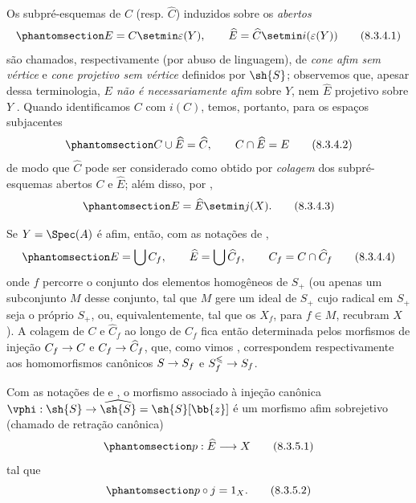 \documentclass[oneside,10pt]{amsart}
\makeatletter
\renewcommand{\leq}{\leqslant}
\newcommand{\ega@arrow}[2]{\mathchoice{#1}{#2}{#2}{#2}}
\renewcommand{\to}{\ega@arrow{\longrightarrow}{\rightarrow}}
\newcommand{\oldpage}[2][]{\marginnote{\normalfont\footnotesize\textbf{#1}~|~#2}\ignorespaces}
\let\EGAOriginalLabel\label
\renewcommand{\label}[1]{\phantomsection\EGAOriginalLabel{#1}}
\makeatother
\begin{document}
\begin{env}[8.3.4]
\label{II.8.3.4}
Os subpré-esquemas de $C$ (resp. $\widehat{C}$) induzidos sobre os \emph{abertos}
\[
\label{II.8.3.4.1}
  E = C \setmin \varepsilon(Y),
  \qquad
  \widehat{E} = \widehat{C} \setmin i(\varepsilon(Y))
\tag{8.3.4.1}
\]
são chamados, respectivamente (por abuso de linguagem), de \emph{cone afim sem vértice} e \emph{cone projetivo sem vértice} definidos por $\sh{S}$;
observemos que, apesar dessa terminologia, \emph{$E$ não é necessariamente afim} sobre $Y$, nem $\widehat{E}$ projetivo sobre $Y$ .
Quando identificamos $C$ com $i(C)$, temos, portanto, para os espaços subjacentes
\[
\label{II.8.3.4.2}
  C \cup \widehat{E} = \widehat{C},
  \qquad
  C \cap \widehat{E} = E
\tag{8.3.4.2}
\]
de modo que $\widehat{C}$ pode ser considerado como obtido por \emph{colagem} dos subpré-esquemas abertos $C$ e $\widehat{E}$;
além disso, por ,
\[
\label{II.8.3.4.3}
  E = \widehat{E} \setmin j(X).
\tag{8.3.4.3}
\]

\oldpage[II]{165}
Se $Y=\Spec(A)$ é afim, então, com as notações de ,
\[
\label{II.8.3.4.4}
  E = \bigcup C_f,
  \qquad
  \widehat{E} = \bigcup \widehat{C}_f,
  \qquad
  C_f = C \cap \widehat{C}_f
\tag{8.3.4.4}
\]
onde $f$ percorre o conjunto dos elementos homogêneos de $S_+$ (ou apenas um subconjunto $M$ desse conjunto, tal que $M$ gere um ideal de $S_+$ cujo radical em $S_+$ seja o próprio $S_+$, ou, equivalentemente, tal que os $X_f$, para $f\in M$, recubram $X$ ).
A colagem de $C$ e $\widehat{C}_f$ ao longo de $C_f$ fica então determinada pelos morfismos de injeção $C_f\to C$ e $C_f\to\widehat{C}_f$, que, como vimos , correspondem respectivamente aos homomorfismos canônicos $S\to S_f$ e $S_f^\leq\to S_f$.
\end{env}
\begin{proposition}[8.3.5]
\label{II.8.3.5}
Com as notações de  e , o morfismo associado  à injeção canônica $\vphi:\sh{S} \to \widehat{\sh{S}} = \sh{S}[\bb{z}]$ é um morfismo afim sobrejetivo (chamado de retração canônica)
\[
\label{II.8.3.5.1}
  p:\widehat{E} \to X
\tag{8.3.5.1}
\]
tal que
\[
\label{II.8.3.5.2}
  p \circ j = 1_X.
\tag{8.3.5.2}
\]
\end{proposition}
\end{document}
